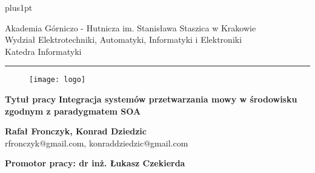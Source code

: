 \documentclass[a4paper, twoside,11pt, openright]{Latex/Classes/PhDthesisPSnPDF}
\begin{document}
\def\tablename{Tabela}
\def\listtablename{Spis tabel}%


\renewcommand\baselinestretch{1.2}
\baselineskip=18pt plus1pt




\thispagestyle{empty}

\begin{center}
Akademia Górniczo - Hutnicza im. Stanisława Staszica w Krakowie \\
Wydział Elektrotechniki, Automatyki, Informatyki i Elektroniki \\
Katedra Informatyki
\rule{\textwidth}{.1mm}
\end{center}

\begin{figure}[hkp!]
 \centering
 \texttt{[image: logo]}
 \label{fig:orzel_agh}
\end{figure}

\begin{center}
{\bf \large Tytuł pracy}
\vskip 10pt
{\bf \Large Integracja systemów przetwarzania mowy w środowisku zgodnym z paradygmatem SOA}
\end{center}

\vskip 60pt
\begin{center}
{\Large \bf Rafał Fronczyk, Konrad Dziedzic}\\
{rfronczyk@gmail.com, konraddziedzic@gmail.com}
\end{center}

\vskip 50pt
\begin{center}
{\bf
    Promotor pracy: dr inż. Łukasz Czekierda
}
\end{center}
\end{document}

